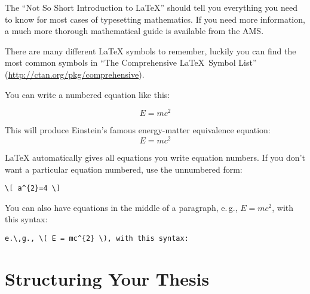The \enquote{Not So Short Introduction to LaTeX} should tell you everything you need to know for most cases of typesetting mathematics. If you need more information, a much more thorough mathematical guide is available from the AMS.

There are many different LaTeX symbols to remember, luckily you can find the most common symbols in ``The Comprehensive \LaTeX~Symbol List'' (\url{http://ctan.org/pkg/comprehensive}).

You can write a numbered equation like this:
\begin{latex}
\begin{equation}
E = mc^{2}
\label{eqn:Einstein}
\end{equation}
\end{latex}

This will produce Einstein's famous energy-matter equivalence equation:
\begin{equation}
E = mc^{2}
\label{eqn:Einstein}
\end{equation}

LaTeX automatically gives all equations you write equation numbers. If you don't want a particular equation numbered, use the unnumbered form:
\begin{verbatim}
\[ a^{2}=4 \]
\end{verbatim}

You can also have equations in the middle of a paragraph, e.\,g., \( E = mc^{2} \), with this syntax: 
\begin{verbatim}
e.\,g., \( E = mc^{2} \), with this syntax:
\end{verbatim}


\section{Structuring Your Thesis}

